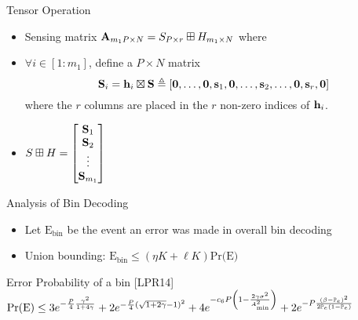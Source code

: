 \begin{frame}{Tensor Operation}
\begin{itemize}
\item Sensing matrix $\mathbf{A}_{m_{1}P\times N}= S_{P\times r}\boxplus H_{m_{1}\times N}$ where
\vspace{2ex}
\item $\forall i\in [1:m_1]$, define a $P\times N$ matrix
\begin{equation*}
\mathbf{S}_i=\mathbf{h}_i \boxtimes \mathbf{S}\triangleq [\mathbf{0},\ldots,\mathbf{0},\mathbf{s}_1,\mathbf{0},\ldots,\mathbf{s}_2,\ldots,\mathbf{0},\mathbf{s}_r,\mathbf{0}]
\end{equation*}
where the $r$ columns are placed in the $r$ non-zero indices of $\mathbf{h}_i$.
\vspace{2ex}
\item $S\boxplus H=\begin{bmatrix}
\mathbf{S}_1\\
\mathbf{S}_2\\
\vdots\\
\mathbf{S}_{m_1}
\end{bmatrix}
$
\end{itemize}
\end{frame}


\begin{frame}{Analysis of Bin Decoding}
\begin{itemize}
\item Let $\text{E}_{\text{bin}}$ be the event an error was made in overall bin decoding
\item Union bounding: $\text{E}_{\text{bin}}\leq (\eta K+\ell K)\text{Pr(E)}$
\end{itemize}

\begin{block}{Error Probability of a bin [LPR14]}
$\text{Pr(E)}\leq 3e^{-\frac{P}{4}\frac{\gamma^2}{1+4 \gamma}}+2e^{-\frac{P}{4}(\sqrt{1+2\gamma}-1)^2}+4e^{-c_6 P\left(1-\frac{2\gamma\sigma^2}{A^{2}_{\text{min}}}\right)}+2e^{-P\frac{\left(\beta-\mathbb{P}_{e}\right)^2}{2\mathbb{P}_{e}(1-\mathbb{P}_{e})}}$
\end{block}

\end{frame}